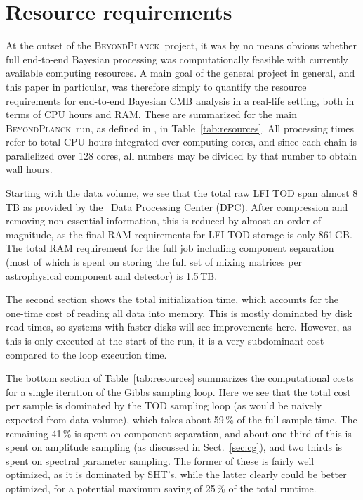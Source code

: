 \documentclass[twocolumn]{aa}
\newcommand{\BP}{\textsc{BeyondPlanck}}
\begin{document}
\section{Resource requirements}

At the outset of the \BP\ project, it was by no means obvious whether
full end-to-end Bayesian processing was computationally feasible with
currently available computing resources. A main goal of the general
project in general, and this paper in particular, was therefore simply
to quantify the resource requirements for end-to-end Bayesian CMB
analysis in a real-life setting, both in terms of CPU hours and
RAM. These are summarized for the main \BP\ run, as defined in
\citet{BP01}, in Table~\ref{tab:resources}. All processing times refer
to total CPU hours integrated over computing cores, and since each
chain is parallelized over 128 cores, all numbers may be divided by
that number to obtain wall hours.

Starting with the data volume, we see that the total raw LFI TOD span
almost 8\,TB as provided by the \Planck\ Data Processing Center
(DPC). After compression and removing
non-essential information, this is reduced by almost an order of
magnitude, as the final RAM requirements for LFI TOD storage is only
861\,GB. The total RAM requirement for the full job including
component separation (most of which is spent on storing the full set
of mixing matrices per astrophysical component and detector) is
1.5\,TB.

The second section shows the total initialization time, which accounts
for the one-time cost of reading all data into memory. This is
mostly dominated by disk read times, so systems with faster disks will
see improvements here. However, as this is only executed at the start
of the run, it is a very subdominant cost compared to the loop
execution time.

The bottom section of Table~\ref{tab:resources} summarizes the
computational costs for a single iteration of the Gibbs sampling
loop. Here we see that the total cost per sample is dominated by the
TOD sampling loop (as would be naively expected from data volume),
which takes about 59\,\% of the full sample time. The remaining 41\,\%
is spent on component separation, and about one third of this is spent
on amplitude sampling (as discussed in Sect.~\ref{sec:cg}), and two
thirds is spent on spectral parameter sampling. The former of these is
fairly well optimized, as it is dominated by SHT's, while the latter
clearly could be better optimized, for a potential maximum saving of
25\,\% of the total runtime. 
\end{document}
